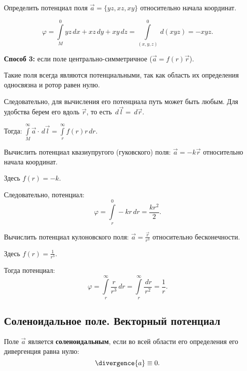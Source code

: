 	\begin{example}
	Определить потенциал поля \( \vec{a} = \{ yz, xz, xy \} \) относительно начала координат.
	\end{example}
	\begin{solution}
	
	\[ \varphi = \int\limits_M^0 yz\,d x + xz\,d y + xy\,d z = \int\limits_{(x, y, z)}^0 \,d(xyz) = -xyz. \]
	\end{solution}
	
	\textbf{Способ 3:} если поле центрально-симметричное (\( \vec{a} = f(r)\vec{r} \)).

	Такие поля всегда являются потенциальными, так как область их определения односвязна и ротор равен нулю.
	
	Следовательно, для вычисления его потенциала путь может быть любым. Для удобства берем его вдоль \( \vec{r} \), то есть \( \,d\vec{l} = \,d\vec{r} \).
	
	Тогда: \( \int\limits_M^\infty \vec{a}\cdot\,d\vec{l} = \int\limits_r^\infty f(r)r\,d r \).
	
	\begin{example}
	Вычислить потенциал квазиупругого (гуковского) поля: \( \vec{a} = -k\vec{r} \) относительно начала координат.
	\end{example}
	\begin{solution}
	
	Здесь \( f(r) = -k \).
	
	Следовательно, потенциал:
	\[ \varphi = \int\limits_r^0 -kr\,d r = \frac{kr^2}{2}. \]
	\end{solution}
	
	\begin{example}
	Вычислить потенциал кулоновского поля: \( \vec{a} = \frac{\vec{r}}{r^3} \) относительно бесконечности.
	\end{example}
	\begin{solution}
	
	Здесь \( f(r) = \frac{1}{r^3} \).
	
	Тогда потенциал:
	\[ \varphi = \int\limits_r^\infty \frac{r}{r^3}\,d r = \int\limits_r^\infty \frac{\,d r}{r^2} = \frac{1}{r}. \]
	\end{solution}

\subsection{Соленоидальное поле. Векторный потенциал}

	\begin{definition}
	Поле \( \vec{a} \) является \textbf{соленоидальным}, если во всей области его определения его дивергенция равна нулю:
	\begin{equation}
		\divergence{a} \equiv 0. \label{eq6.2:1}
	\end{equation}
	\end{definition}
	
